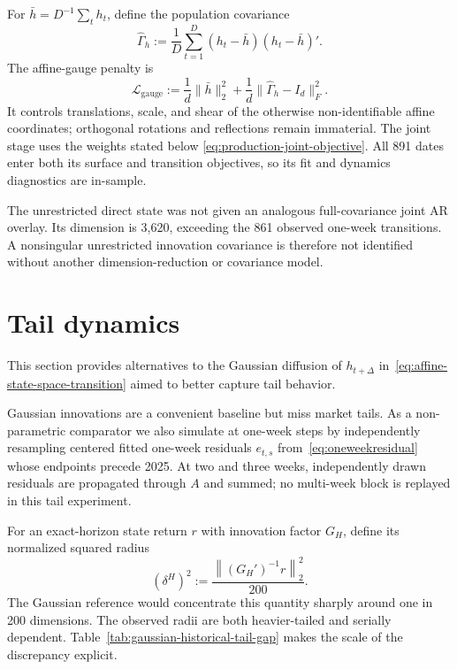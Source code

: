 \documentclass[11pt,a4paper]{article}
\begin{document}
For $\bar h=D^{-1}\sum_t h_t$, define the population covariance
\begin{equation}
  \widehat\Gamma_h
  :=\frac1D\sum_{t=1}^{D}(h_t-\bar h)(h_t-\bar h)'.
\end{equation}
The affine-gauge penalty is
\begin{equation}
  \mathcal L_{\mathrm{gauge}}
  :=\frac1d\lVert\bar h\rVert_2^2
    +\frac1d\lVert\widehat\Gamma_h-I_d\rVert_F^2.
  \label{eq:affine-gauge-penalty}
\end{equation}
It controls translations, scale, and shear of the otherwise non-identifiable
affine coordinates; orthogonal rotations and reflections remain immaterial.
The joint stage uses the weights stated below
\eqref{eq:production-joint-objective}.  All 891 dates enter both its surface
and transition objectives, so its fit and dynamics diagnostics are in-sample.

The unrestricted direct state was not given an analogous full-covariance
joint AR overlay.  Its dimension is 3,620, exceeding the 861 observed
one-week transitions.  A nonsingular unrestricted innovation covariance is
therefore not identified without another dimension-reduction or covariance
model.


\section{Tail dynamics}\label{app:tail-dynamics}

This section provides alternatives to the Gaussian diffusion of $h_{t+\Delta}$
in~\eqref{eq:affine-state-space-transition} aimed to better capture tail behavior.

Gaussian innovations are a convenient baseline but miss market tails.  As a
non-parametric comparator we also simulate at one-week steps by independently
resampling centered fitted one-week residuals $e_{t,s}$ from~\eqref{eq:oneweekresidual} whose endpoints precede 2025.
At two and three weeks, independently drawn residuals are propagated through
$A$ and summed; no multi-week block is replayed in this tail experiment.

For an exact-horizon state return $r$ with innovation factor $G_H$,
define its normalized squared radius
\begin{equation}
  (\delta^H)^2:=\frac{\left\|(G_H')^{-1}r\right\|_2^2}{200}.
  \label{eq:radius}
\end{equation}
The Gaussian reference would concentrate this quantity sharply around one in
200 dimensions.  The observed radii are both heavier-tailed and serially
dependent.  Table~\ref{tab:gaussian-historical-tail-gap} makes the scale of
the discrepancy explicit.
\end{document}
